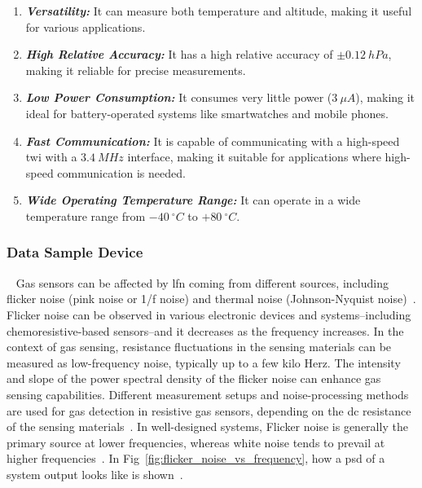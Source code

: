 \begin{itemize}
        \begin{enumerate}
            \item \textbf{\textit{Versatility:}} It can measure both temperature and altitude, making it useful for various applications.

            \item \textbf{\textit{High Relative Accuracy:}} It has a high relative accuracy of $\pm0.12~hPa$, making it reliable for precise measurements.

            \item \textbf{\textit{Low Power Consumption:}} It consumes very little power ($3~\mu A$), making it ideal for battery-operated systems like smartwatches and mobile phones.

            \item \textbf{\textit{Fast Communication:}} It is capable of communicating with a high-speed \acrfull{twi} with a $3.4~MHz$ interface, making it suitable for applications where high-speed communication is needed.

            \item \textbf{\textit{Wide Operating Temperature Range:}} It can operate in a wide temperature range from $-40~^{\circ}C$ to $+80~^{\circ}C$.
        \end{enumerate}
\end{itemize}


\subsubsection{Data Sample Device}
~\label{sec:methodology:dev_methodology:sensors:dsd}
\hspace{8pt}
Gas sensors can be affected by \acrfull{lfn} coming from different sources, including flicker noise (pink noise or 1/f noise) and thermal noise (Johnson-Nyquist noise)~\cite{Kwon_2014, wonjun_2023,smulko_2024}. \\

Flicker noise can be observed in various electronic devices and systems--including chemoresistive-based sensors--and it decreases as the frequency increases. In the context of gas sensing, resistance fluctuations in the sensing materials can be measured as low-frequency noise, typically up to a few kilo Herz. The intensity and slope of the power spectral density of the flicker noise can enhance gas sensing capabilities. Different measurement setups and noise-processing methods are used for gas detection in resistive gas sensors, depending on the \acrfull{dc} resistance of the sensing materials~\cite{Kwon_2014, kiely_2017}. In well-designed systems, Flicker noise is generally the primary source at lower frequencies, whereas white noise tends to prevail at higher frequencies~\cite{bahreyni_2009}. In Fig~\ref{fig:flicker_noise_vs_frequency}, how a \acrfull{psd} of a system output looks like is shown~\cite{bahreyni_2009}.


